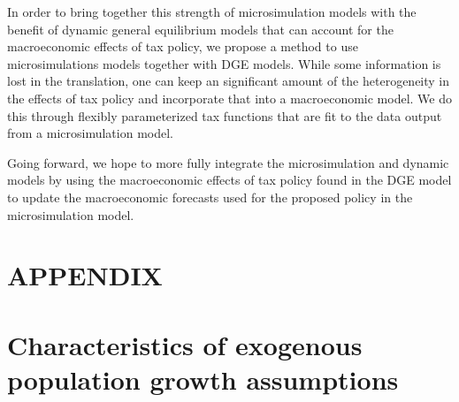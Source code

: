 \documentclass[letterpaper,12pt]{article}
\theoremstyle{definition}
\begin{document}
\begin{spacing}{1.5}
  In order to bring together this strength of microsimulation models with the benefit of dynamic general equilibrium models that can account for the macroeconomic effects of tax policy, we propose a method to use microsimulations models together with DGE models.  While some information is lost in the translation, one can keep an significant amount of the heterogeneity in the effects of tax policy and incorporate that into a macroeconomic model.  We do this through flexibly parameterized tax functions that are fit to the data output from a microsimulation model.

  Going forward, we hope to more fully integrate the microsimulation and dynamic models by using the macroeconomic effects of tax policy found in the DGE model to update the macroeconomic forecasts used for the proposed policy in the microsimulation model.


  \clearpage


\end{spacing}


\newpage



\newpage
\renewcommand{\theequation}{A.\arabic{section}.\arabic{equation}}
\renewcommand{\thesection}{A-\arabic{section}}   %
\setcounter{equation}{0}                         %
\setcounter{section}{0}                          %
\section*{APPENDIX}                              %

\section{Characteristics of exogenous population growth assumptions}\label{AppPopGrowth}
\end{document}
